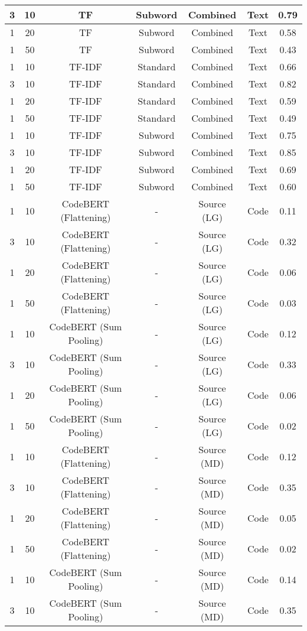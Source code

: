 \begin{longtable}{|c|c|c|c|c|c|c|}
3 & 10 & TF & Subword & Combined & Text & 0.79 \\
\hline
1 & 20 & TF & Subword & Combined & Text & 0.58 \\
\hline
1 & 50 & TF & Subword & Combined & Text & 0.43 \\
\hline
1 & 10 & TF-IDF & Standard & Combined & Text & 0.66 \\
\hline
3 & 10 & TF-IDF & Standard & Combined & Text & 0.82 \\
\hline
1 & 20 & TF-IDF & Standard & Combined & Text & 0.59 \\
\hline
1 & 50 & TF-IDF & Standard & Combined & Text & 0.49 \\
\hline
1 & 10 & TF-IDF & Subword & Combined & Text & 0.75 \\
\hline
3 & 10 & TF-IDF & Subword & Combined & Text & 0.85 \\
\hline
1 & 20 & TF-IDF & Subword & Combined & Text & 0.69 \\
\hline
1 & 50 & TF-IDF & Subword & Combined & Text & 0.60 \\
\hline
1 & 10 & CodeBERT (Flattening) & - & Source (LG) & Code & 0.11 \\
\hline
3 & 10 & CodeBERT (Flattening) & - & Source (LG) & Code & 0.32 \\
\hline
1 & 20 & CodeBERT (Flattening) & - & Source (LG) & Code & 0.06 \\
\hline
1 & 50 & CodeBERT (Flattening) & - & Source (LG) & Code & 0.03 \\
\hline
1 & 10 & CodeBERT (Sum Pooling) & - & Source (LG) & Code & 0.12 \\
\hline
3 & 10 & CodeBERT (Sum Pooling) & - & Source (LG) & Code & 0.33 \\
\hline
1 & 20 & CodeBERT (Sum Pooling) & - & Source (LG) & Code & 0.06 \\
\hline
1 & 50 & CodeBERT (Sum Pooling) & - & Source (LG) & Code & 0.02 \\
\hline
1 & 10 & CodeBERT (Flattening) & - & Source (MD) & Code & 0.12 \\
\hline
3 & 10 & CodeBERT (Flattening) & - & Source (MD) & Code & 0.35 \\
\hline
1 & 20 & CodeBERT (Flattening) & - & Source (MD) & Code & 0.05 \\
\hline
1 & 50 & CodeBERT (Flattening) & - & Source (MD) & Code & 0.02 \\
\hline
1 & 10 & CodeBERT (Sum Pooling) & - & Source (MD) & Code & 0.14 \\
\hline
3 & 10 & CodeBERT (Sum Pooling) & - & Source (MD) & Code & 0.35 \\

\end{longtable}
